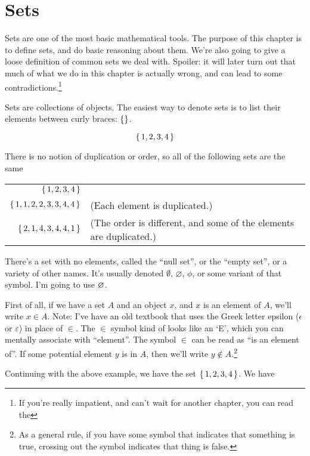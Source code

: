 \chapter{Sets}

Sets are one of the most basic mathematical tools. The purpose of this
chapter is to define sets, and do basic reasoning about them. We're
also going to give a loose definition of common sets we deal
with. Spoiler: it will later turn out that much of what we do in this
chapter is actually wrong, and can lead to some
contradictions.\footnote{If you're really impatient, and can't wait
  for another chapter, you can read the }

Sets are collections of objects. The easiest way to denote sets is to
list their elements between curly braces: $\left\{  \right\}$.

\begin{displaymath}
  \left\{ \, 1,2,3,4 \, \right\}
\end{displaymath}

There is no notion of duplication or order, so all of the following
sets are the same

\begin{tabu}{rp{5.5cm}}
  $\left\{ \, 1,2,3,4 \, \right\}$         & \\
  $\left\{ \, 1,1,2,2,3,3,4,4 \, \right\}$ & (Each element is duplicated.) \\
  $\left\{ \, 2,1,4,3,4,4,1 \, \right\}$   & (The order is different, and some of the elements are duplicated.)
\end{tabu}

There's a set with no elements, called the ``null set'', or the
``empty set'', or a variety of other names. It's usually denoted
$\emptyset$, $\varnothing$, $\phi$, or some variant of that
symbol. I'm going to use $\varnothing$.

First of all, if we have a set $A$ and an object $x$, and $x$ is an
element of $A$, we'll write $x \in A$. Note: I've have an old textbook
that uses the Greek letter epsilon ($\epsilon$ or $\varepsilon$) in
place of $\in$. The $\in$ symbol kind of looks like an `E', which you
can mentally associate with ``element''. The symbol $\in$ can be read
as ``is an element of''. If some potential element $y$ is  in
$A$, then we'll write $y \notin A$.\footnote{As a general rule, if you
  have some symbol that indicates that something is true, crossing out
  the symbol indicates that thing is false.}

Continuing with the above example, we have the set
$\left\{ \, 1,2,3,4 \, \right\}$. We have

